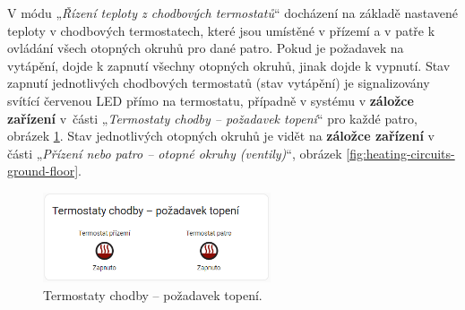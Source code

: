 
\begin{Czech}
\end{Czech}

\begin{Czech}
V módu „\textit{Řízení teploty z chodbových termostatů}“ docházení na základě nastavené teploty v chodbových termostatech, které jsou umístěné v přízemí a v patře k ovládání všech otopných okruhů pro dané patro. Pokud je požadavek na vytápění, dojde k zapnutí všechny otopných okruhů, jinak dojde k vypnutí. Stav zapnutí jednotlivých chodbových termostatů (stav vytápění) je signalizovány svítící červenou LED přímo na termostatu, případně v systému v \textbf{záložce zařízení} \mbox{v části} „\textit{Termostaty chodby – požadavek topení}“ pro každé patro, obrázek \ref{fig:corridor-thermostats}. Stav jednotlivých otopných okruhů je vidět na \textbf{záložce zařízení} v části „\textit{Přízení nebo patro – otopné okruhy (ventily)}“, obrázek \ref{fig:heating-circuits-ground-floor}.
\end{Czech}

\begin{Czech}
\begin{figure}[H]
    \centering
    \includegraphics[width=0.6\textwidth]{pictures/czech/software/corridor-thermostats.png}
    \caption{Termostaty chodby – požadavek topení.}
    \label{fig:corridor-thermostats}
\end{figure}
\end{Czech}

